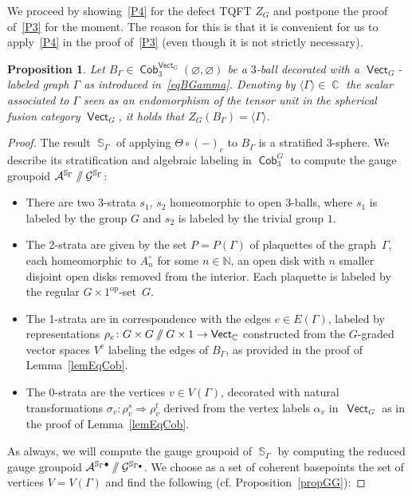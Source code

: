 \documentclass[pdftex]{sigma}
\DeclareMathOperator{\vect}{\mathsf{Vect}}
\DeclareMathOperator{\C}{\mathbb{C}}
\DeclareMathOperator{\Sp}{\mathbb{S}}
\DeclareMathOperator{\Cob}{\mathsf{Cob}}
\newcommand{\sslash}{\mathbin{/\mkern-6mu/}}
\numberwithin{equation}{section}
\newtheorem{Proposition}[Proposition]{Proposition}
\theoremstyle{definition}
\begin{document}
We proceed by showing~\ref{P4} for the defect TQFT $Z_G$ and postpone the proof of~\ref{P3} for the moment. The reason for this is that it is convenient for us to apply~\ref{P4} in the proof of~\ref{P3} (even though it is not strictly necessary).
\begin{Proposition}
\label{propDW4}
 Let $B_{\Gamma} \in \Cob_3^{\vect_G}(\varnothing, \varnothing)$ be a $3$-ball decorated with a $\vect_G$-labeled graph $\Gamma$ as introduced in~\eqref{eqBGamma}. Denoting by $\langle \Gamma \rangle \in \C$ the scalar associated to $\Gamma$ seen as an endomorphism of the tensor unit in the spherical fusion category $\vect_G$, it holds that $Z_G(B_{\Gamma}) = \langle \Gamma \rangle$.
\end{Proposition}
\begin{proof}
The result $\Sp_{\Gamma}$ of applying $\Theta \circ (-)_c$ to $B_{\Gamma}$ is a stratified 3-sphere. We describe its stratification and algebraic labeling in $\Cob_3^G$ to compute the gauge groupoid $\mathcal{A}^{\mathbb{S}_{\Gamma}} \sslash \mathcal{G}^{\mathbb{S}_{\Gamma}}$:
\begin{itemize}\itemsep=0pt
 \item There are two 3-strata $s_1$, $s_2$ homeomorphic to open 3-balls, where $s_1$ is labeled by the group $G$ and $s_2$ is labeled by the trivial group $1$.
 \item The 2-strata are given by the set $P = P(\Gamma)$ of plaquettes of the graph~$\Gamma$, each homeomorphic to $A_n^{\circ}$ for some $n \in \mathbb{N}$, an open disk with $n$ smaller disjoint open disks removed from the interior. Each plaquette is labeled by the regular $G \times 1^{\mathrm{op}}$-set~$G$.
 \item The 1-strata are in correspondence with the edges $e \in E(\Gamma)$, labeled by representations $\rho_e\colon G \times G \sslash G \times 1 \rightarrow \vect_{\C}$ constructed from the $G$-graded vector spaces $V^e$ labeling the edges of $B_{\Gamma}$, as provided in the proof of Lemma~\ref{lemEqCob}.
 \item The 0-strata are the vertices $v \in V(\Gamma)$, decorated with natural transformations $\sigma_v\colon \rho_v^s \Rightarrow \rho_v^t$ derived from the vertex labels $\alpha_v$ in~$\vect_G$ as in the proof of Lemma~\ref{lemEqCob}.
\end{itemize}
As always, we will compute the gauge groupoid of $\Sp_{\Gamma}$ by computing the reduced gauge groupoid $\mathcal{A}^{\mathbb{S}_{\Gamma} \bullet} \sslash \mathcal{G}^{\mathbb{S}_{\Gamma \bullet}}$. We choose as a set of coherent basepoints the set of vertices $V = V(\Gamma)$ and find the following (cf. Proposition~\ref{propGG}):

\end{proof}
\end{document}
